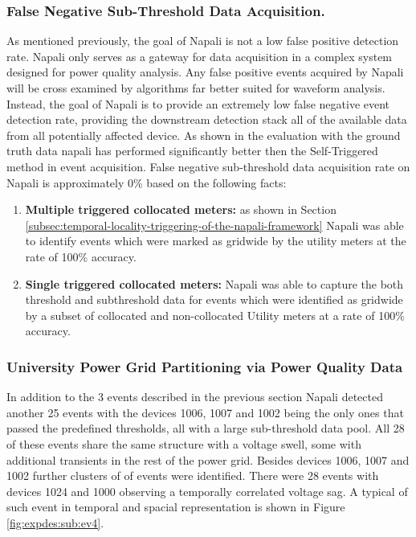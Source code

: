 \subsubsection{False Negative Sub-Threshold Data Acquisition.}

As mentioned previously, the goal of Napali is not a low false positive detection rate.
Napali only serves as a gateway for data acquisition in a complex system designed for power quality analysis.
Any false positive events acquired by Napali will be cross examined by algorithms far better suited for waveform analysis.
Instead, the goal of Napali is to provide an extremely low false negative event detection rate, providing the downstream detection stack all of the available data from all potentially affected device.
As shown in the evaluation with the ground truth data napali has performed significantly better then the Self-Triggered method in event acquisition.
False negative sub-threshold data acquisition rate on Napali is approximately 0\% based on the following facts:
\begin{enumerate}
    \item \textbf{Multiple triggered collocated meters:} as shown in Section \ref{subsec:temporal-locality-triggering-of-the-napali-framework} Napali was able to identify events which were marked as gridwide by the utility meters at the rate of 100\% accuracy.
    \item \textbf{Single triggered collocated meters:} Napali was able to capture the both threshold and subthreshold data for events which were identified as gridwide by a subset of collocated and non-collocated Utility meters at a rate of 100\% accuracy.
\end{enumerate}

\subsubsection{University Power Grid Partitioning via Power Quality Data}

In addition to the 3 events described in the previous section Napali detected another 25 events with the devices 1006, 1007 and 1002 being the only ones that passed the predefined thresholds, all with a large sub-threshold data pool.
All 28 of these events share the same structure with a voltage swell, some with additional transients in the rest of the power grid.
Besides devices 1006, 1007 and 1002 further clusters of of events were identified.
There were 28 events with devices 1024 and 1000 observing a temporally correlated voltage sag.
A typical of such event in temporal and spacial representation is shown in Figure \ref{fig:expdes:sub:ev4}.


